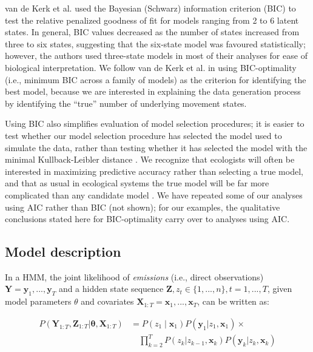 \documentclass{bmcart}
\newcommand{\obs}{\mathbf{y}}
\newcommand{\cov}{\mathbf{x}}
\newcommand{\state}{z}
\begin{document}
van de Kerk et al. \cite{kerk2015hidden} used the Bayesian (Schwarz) information criterion (BIC)
to test the relative penalized goodness of fit for
models ranging from 2 to 6 latent states.
In general, BIC values decreased as the number of states
increased from 
three to six states,
suggesting that the six-state model was
favoured statistically; however,
the authors used three-state models in most
of their analyses for ease of biological interpretation.
We follow van de Kerk et al. \cite{kerk2015hidden} in using BIC-optimality (i.e., minimum
BIC across a family of models) as the criterion for identifying
the best model, because we are interested in explaining the 
data generation process by identifying the ``true'' number 
of underlying movement states.  

Using BIC also simplifies 
evaluation of model selection procedures; 
it is easier to test whether our model selection
procedure has selected the model used to simulate the data,
rather than testing whether it has selected the model with
the minimal Kullback-Leibler distance
\cite{Richards2005}. We recognize that 
ecologists will often be interested in maximizing predictive
accuracy rather than selecting a true model, and that as
usual in ecological systems the true model will be far more
complicated than any candidate model \cite{BurnhamAnderson1998}.
We have repeated some of our analyses using AIC rather than BIC
(not shown); for our examples, the qualitative conclusions stated here
for BIC-optimality carry over to analyses using AIC.

\subsection*{Model description}


In a HMM, the joint likelihood of \emph{emissions} (i.e., direct observations) $ \mathbf Y = \obs_{1},..., \obs_{T}$ 
and a hidden state sequence $\mathbf{Z}, \state_{t} \in \{1,...,n\}, t=1,...,T$, given model
parameters {\boldmath $\theta$} and covariates $\mathbf{X}_{1:T} =\cov_{1},..., \cov_{T}$, can be written as:

\begin{equation}
\begin{split}
P(\mathbf{Y}_{1:T},\mathbf{Z}_{1:T}|\boldsymbol \theta,\mathbf{X}_{1:T}) & =
P(\state_{1} \mid \cov_{1})P(\obs_{1} | \state_{1}, \cov_{1}) \times \\
&  \quad \prod\limits_{k=2}^{T}P(\state_{k} | \state_{k-1}, \cov_{k})P(\obs_{k} | \state_{k},\cov_{k})
\end{split}
\label{eq:HMMlik}
\end{equation}
\end{document}
